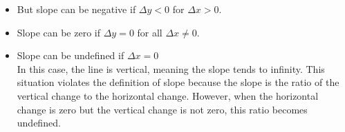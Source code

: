 \documentclass{article}
\begin{document}
    \begin{itemize}
        \item But slope can be negative if $\Delta y < 0$ for $\Delta x > 0$.
            \begin{center}
            \end{center}

        \item Slope can be zero if $\Delta y = 0$ for all $\Delta x \neq 0$.
            \begin{center}
            \end{center}

        \item Slope can be undefined if $\Delta x = 0$\\
            In this case, the line is vertical, meaning the slope tends to infinity. This situation violates the definition of slope because the slope is the ratio of the vertical change to the horizontal change. However, when the horizontal change is zero but the vertical change is not zero, this ratio becomes undefined.
            \begin{center}
            \end{center}
    \end{itemize}
\end{document}
